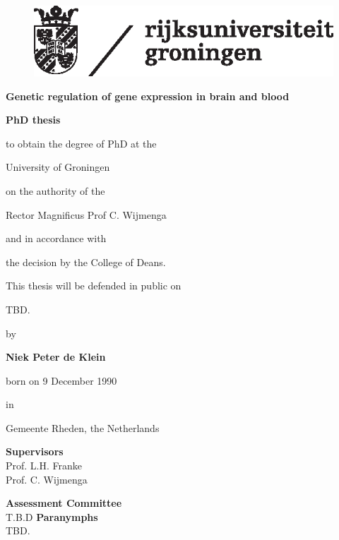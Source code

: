 
\begin{figure}[H]
	\includegraphics{img/rugr_logonl_zwart_cmyk.eps}
\end{figure}


\huge \textbf{Genetic regulation of gene expression in brain and blood}
\large
\vspace{2.5cm}
\\
\centerline{\textbf{ PhD thesis}}
\normalsize
\vspace{0.5cm}

\centerline{to obtain the degree of PhD at the}
\centerline{University of Groningen}
\centerline{on the authority of the}
\centerline{Rector Magnificus Prof C. Wijmenga}
\centerline{and in accordance with}
\centerline{the decision by the College of Deans.}
\vspace{0.2cm}
\centerline{This thesis will be defended in public on}
\vspace{0.2cm}
\centerline{TBD.}
\vspace{0.5cm}
\centerline{by}
\vspace{0.5cm}
\centerline{\textbf{Niek Peter de Klein}}
\centerline{born on 9 December 1990}
\centerline{in}
\centerline{Gemeente Rheden, the Netherlands}

\newpage
\textbf{Supervisors} \\
Prof. L.H. Franke \\
Prof. C. Wijmenga

\textbf{Assessment Committee} \\
T.B.D
\newpage
\textbf{Paranymphs} \\
TBD.

\clearpage